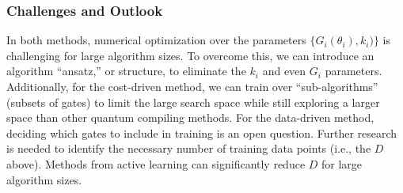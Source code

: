 \documentclass[10pt]{article}
\begin{document}






\subsubsection{Challenges and Outlook} 
In both methods, numerical optimization over the parameters $\{G_i(\theta_i), k_i)\}$ is challenging for large algorithm sizes. To overcome this, we can introduce an algorithm ``ansatz,'' or structure, to eliminate the $k_i$ and even $G_i$ parameters. Additionally, for the cost-driven method, we can train over ``sub-algorithms'' (subsets of gates) to limit the large search space while still exploring a larger space than other quantum compiling methods. %
For the data-driven method, deciding which gates to include in training is an open question. Further research is needed to identify the necessary number of training data points (i.e., the $D$ above). Methods from active learning can significantly reduce $D$ for large algorithm sizes.
\end{document}

